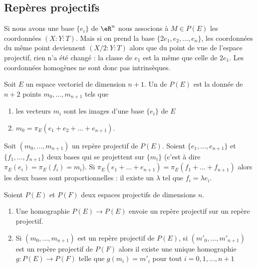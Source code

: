 \subsection{Repères projectifs}

Si nous avons une base \( \{ e_i \}\) de \( \eR^n\) nous associons à \( M\in P(E)\) les coordonnées \( (X:Y:T)\). Mais si on prend la base \( \{ 2e_1,e_2,\ldots, e_n \}\), les coordonnées du même point deviennent \( (X/2:Y:T)\) alors que du point de vue de l'espace projectif, rien n'a été changé : la classe de \( e_1\) est la même que celle de \( 2e_1\). Les coordonnées homogènes ne sont donc pas intrinsèques.

\begin{definition}
    Soit \( E\) un espace vectoriel de dimension \( n+1\). Un  de \( P(E)\) est la donnée de \( n+2\) points \( m_0,\ldots, m_{n+1}\) tels que
    \begin{enumerate}
        \item
            les vecteurs \( m_i\) sont les images d'une base \( \{ e_i \}\) de \( E\)
        \item
            \( m_0=\pi_E(e_1+e_2+\ldots +e_{n+1})\).
    \end{enumerate}
\end{definition}

\begin{lemma}
    Soit \( (m_0,\ldots, m_{n+1})\) un repère projectif de \( P(E)\). Soient \( \{ e_1,\ldots, e_{n+1} \}\) et \( \{ f_1,\ldots, f_{n+1} \}\) deux bases qui se projettent sur \( \{ m_i \}\) (c'est à dire \( \pi_E(e_i)=\pi_E(f_i)=m_i\)). Si \( \pi_E(e_1+\ldots +e_{n+1})=\pi_E(f_1+\ldots +f_{n+1})\) alors les deux bases sont proportionnelles : il existe un \( \lambda\) tel que \( f_i=\lambda e_i\).
\end{lemma}

\begin{theorem}
    Soient \( P(E)\) et \( P(F)\) deux espaces projectifs de dimensions \( n\).
    \begin{enumerate}
        \item
            Une homographie \( P(E)\to P(E)\) envoie un repère projectif sur un repère projectif.
        \item
            Si \( (m_0,\ldots, m_{n+1})\) est un repère projectif de \( P(E)\), si \( (m'_0,\ldots, m'_{n+1})\) est un repère projectif de \( P(F)\) alors il existe une unique homographie \( g\colon P(E)\to P(F)\) telle que \( g(m_i)=m'_i\) pour tout \( i=0,1,\ldots, n+1\)
    \end{enumerate}
\end{theorem}

